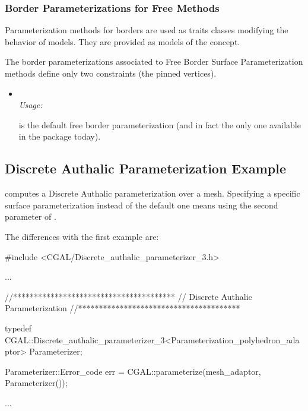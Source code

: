 \subsubsection{Border Parameterizations for Free Methods}
\label{sec:Border-Parameterizations-for-Free-Methods}

Parameterization methods for
borders are used as traits classes modifying the behavior of
 models.
They are provided as models of the  concept.

The border parameterizations associated to Free Border Surface
Parameterization methods define only two constraints
(the pinned vertices).

\begin{itemize}

\item
      \\

    \emph{Usage:}

     is the default
    free border parameterization (and in fact the only one available
    in the package today).

\end{itemize}


\subsection{Discrete Authalic Parameterization Example}

 computes a Discrete Authalic parameterization
over a  mesh. Specifying a specific surface parameterization
instead of the default one means using the second parameter of .

The differences with the first example  are:

\begin{ccExampleCode}

#include <CGAL/Discrete_authalic_parameterizer_3.h>

...

//***************************************
// Discrete Authalic Parameterization
//***************************************

typedef CGAL::Discrete_authalic_parameterizer_3<Parameterization_polyhedron_adaptor>
                                                    Parameterizer;

Parameterizer::Error_code err = CGAL::parameterize(mesh_adaptor, Parameterizer());

...

\end{ccExampleCode}



